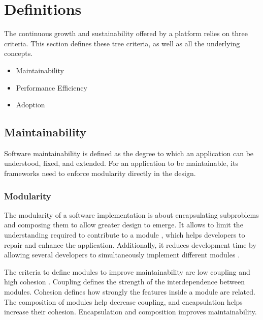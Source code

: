 \section{Definitions} \label{chapter3:definitions}

The continuous growth and sustainability offered by a platform relies on three criteria.
This section defines these tree criteria, as well as all the underlying concepts.


\begin{itemize}
\item Maintainability
\item Performance Efficiency
\item Adoption
\end{itemize}

\subsection{Maintainability}

Software maintainability is defined as the degree to which an application can be understood, fixed, and extended.
For an application to be maintainable, its frameworks need to enforce modularity directly in the design.

\subsubsection{Modularity}

The modularity of a software implementation is about encapsulating subproblems and composing them to allow greater design to emerge.
It allows to limit the understanding required to contribute to a module \cite{Stevens1974}, which helps developers to repair and enhance the application. 
Additionally, it reduces development time by allowing several developers to simultaneously implement different modules \cite{Wong2009,Cataldo2006}.

The criteria to define modules to improve maintainability are low coupling and high cohesion \cite{Stevens1974}.
Coupling defines the strength of the interdependence between modules.
Cohesion defines how strongly the features inside a module are related.
The composition of modules help decrease coupling, and encapsulation helps increase their cohesion.
Encapsulation and composition improves maintainability.

